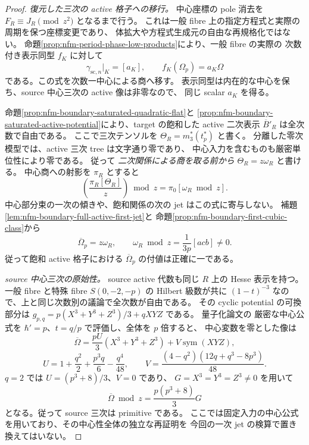 \begin{proof}
\emph{復元した三次の active 格子への移行。}
中心座標の pole 消去を $F_R\equiv J_R\pmod{z^2}$ となるまで行う。
これは一般 fibre 上の指定方程式と実際の周期を保つ座標変更であり、
体拡大や方程式生成元の自由な再規格化ではない。
命題\ref{prop:nfm-period-phase-low-products}により、一般 fibre の実際の
次数付き表示同型 $f_K$ に対して
\[
 \gamma_{\mathrm{sc},n}|_K=[a_K],\qquad
 f_K(\Omega_p)=a_K\Omega
\]
である。この式を次数一中心による商へ移す。
表示同型は内在的な中心を保ち、source 中心三次の active 像は非零なので、
同じ scalar $a_K$ を得る。

命題\ref{prop:nfm-boundary-saturated-quadratic-flat}と
\ref{prop:nfm-boundary-saturated-active-potential}により、target の飽和した
active 二次表示 $\overline B'_R$ は全次数で自由である。
ここで三次テンソルを $\Theta_R=m_3^*(t_p^*)$ と書く。
分離した零次模型では、active 三次 tree は文字通り零であり、
中心入力を含むものも厳密単位性により零である。
従って \emph{二次関係による商を取る前から}
$\Theta_R=z\omega_R$ と書ける。
中心商への射影を $\pi_R$ とすると
\[
 \left(\frac{\pi_R[\Theta_R]}z\right)\bmod z
      =\pi_0[\omega_R\bmod z].
\]
中心部分束の一次の傾きや、飽和関係の次の jet はこの式に寄与しない。
補題\ref{lem:nfm-boundary-full-active-first-jet}と
命題\ref{prop:nfm-boundary-first-cubic-class}から
\[
 \overline\Omega_p=z\omega_R,\qquad
 \omega_R\bmod z=\frac1{3p}[acb]\ne0.
\]
従って飽和 active 格子における $\overline\Omega_p$ の付値は正確に一である。

\emph{source 中心三次の原始性。}
source active 代数も同じ $R$ 上の Hesse 表示を持つ。
一般 fibre と特殊 fibre $S(0,-2,-p)$ の Hilbert 級数が共に
$(1-t)^{-3}$ なので、上と同じ次数別の議論で全次数が自由である。
その cyclic potential の可換部分は
$g_{p,q}=p(X^3+Y^3+Z^3)/3+qXYZ$ である。
量子化論文\cite[Hesse 型の普遍混合中心三次式の定理]{CubicQuantization}の
厳密な中心公式を $\hbar'=p$、$t=q/p$ で評価し、全体を $p$ 倍すると、
中心変数を零とした像は
\[
 \overline\Omega=
 \frac{pU}{3}(X^3+Y^3+Z^3)+V\operatorname{sym}(XYZ),
\]
\[
 U=1+\frac{q^2}{2}+\frac{p^3q}{6}-\frac{q^4}{48},\qquad
 V=\frac{(4-q^2)(12q+q^3-8p^3)}{48}.
\]
$q=2$ では $U=(p^3+8)/3$、$V=0$ であり、
$G=X^3=Y^3=Z^3\ne0$ を用いて
\begin{equation}\label{eq:nfm-boundary-source-center-primitive}
 \overline\Omega\bmod z=\frac{p(p^3+8)}3G
\end{equation}
となる。従って source 三次は primitive である。
ここでは固定入力の中心公式を用いており、その中心性全体の独立な再証明を
今回の一次 jet の検算で置き換えてはいない。


\end{proof}

